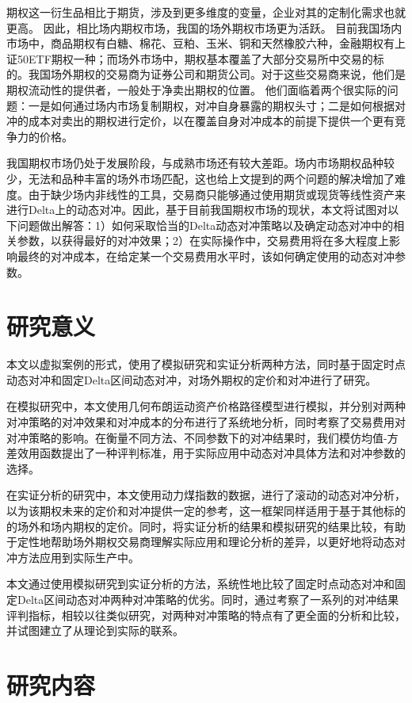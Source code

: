 期权这一衍生品相比于期货，涉及到更多维度的变量，企业对其的定制化需求也就更高。
因此，相比场内期权市场，我国的场外期权市场更为活跃。
目前我国场内市场中，商品期权有白糖、棉花、豆粕、玉米、铜和天然橡胶六种，金融期权有上证50ETF期权一种；而场外市场中，期权基本覆盖了大部分交易所中交易的标的。我国场外期权的交易商为证券公司和期货公司。对于这些交易商来说，他们是期权流动性的提供者，一般处于净卖出期权的位置。
他们面临着两个很实际的问题：一是如何通过场内市场复制期权，对冲自身暴露的期权头寸；二是如何根据对冲的成本对卖出的期权进行定价，以在覆盖自身对冲成本的前提下提供一个更有竞争力的价格。

我国期权市场仍处于发展阶段，与成熟市场还有较大差距。场内市场期权品种较少，无法和品种丰富的场外市场匹配，这也给上文提到的两个问题的解决增加了难度。由于缺少场内非线性的工具，交易商只能够通过使用期货或现货等线性资产来进行Delta上的动态对冲。因此，基于目前我国期权市场的现状，本文将试图对以下问题做出解答：1）如何采取恰当的Delta动态对冲策略以及确定动态对冲中的相关参数，以获得最好的对冲效果；2）在实际操作中，交易费用将在多大程度上影响最终的对冲成本，在给定某一个交易费用水平时，该如何确定使用的动态对冲参数。

\section{研究意义}

本文以虚拟案例的形式，使用了模拟研究和实证分析两种方法，同时基于固定时点动态对冲和固定Delta区间动态对冲，对场外期权的定价和对冲进行了研究。

在模拟研究中，本文使用几何布朗运动资产价格路径模型进行模拟，并分别对两种对冲策略的对冲效果和对冲成本的分布进行了系统地分析，同时考察了交易费用对对冲策略的影响。在衡量不同方法、不同参数下的对冲结果时，我们模仿均值-方差效用函数提出了一种评判标准，用于实际应用中动态对冲具体方法和对冲参数的选择。

在实证分析的研究中，本文使用动力煤指数的数据，进行了滚动的动态对冲分析，以为该期权未来的定价和对冲提供一定的参考，这一框架同样适用于基于其他标的的场外和场内期权的定价。同时，将实证分析的结果和模拟研究的结果比较，有助于定性地帮助场外期权交易商理解实际应用和理论分析的差异，以更好地将动态对冲方法应用到实际生产中。

本文通过使用模拟研究到实证分析的方法，系统性地比较了固定时点动态对冲和固定Delta区间动态对冲两种对冲策略的优劣。同时，通过考察了一系列的对冲结果评判指标，相较以往类似研究，对两种对冲策略的特点有了更全面的分析和比较，并试图建立了从理论到实际的联系。

\section{研究内容}

